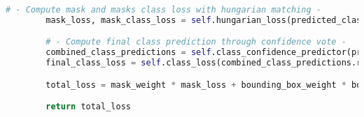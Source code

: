 \begin{lstlisting}[language=Python, caption=Extended Masked-Attention Mask Transformer Model Class]
        # - Compute mask and masks class loss with hungarian matching -
        mask_loss, mask_class_loss = self.hungarian_loss(predicted_classes_masks, predicted_masks, ground_truth_masks_labels, ground_truth_masks)

        # - Compute final class prediction through confidence vote -
        combined_class_predictions = self.class_confidence_predictor(predicted_classes_boxes, predicted_classes_masks)
        final_class_loss = self.class_loss(combined_class_predictions.reshape(-1, combined_class_predictions.size(-1)), ground_truth_masks_labels.reshape(-1))

        total_loss = mask_weight * mask_loss + bounding_box_weight * bounding_box_loss + class_weight * final_class_loss

        return total_loss
\end{lstlisting}